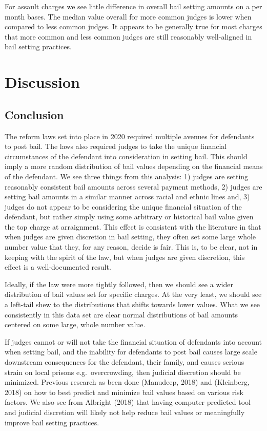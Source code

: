 \documentclass[
  english,
  man]{apa6}
\begin{document}
For assault charges we see little difference in overall bail setting amounts on a per month bases. The median value overall for more common judges is lower when compared to less common judges. It appears to be generally true for most charges that more common and less common judges are still reasonably well-aligned in bail setting practices.

\hypertarget{discussion}{%
\section{Discussion}\label{discussion}}

\hypertarget{conclusion}{%
\subsection{Conclusion}\label{conclusion}}

The reform laws set into place in 2020 required multiple avenues for defendants to post bail. The laws also required judges to take the unique financial circumstances of the defendant into consideration in setting bail. This should imply a more random distribution of bail values depending on the financial means of the defendant. We see three things from this analysis: 1) judges are setting reasonably consistent bail amounts across several payment methods, 2) judges are setting bail amounts in a similar manner across racial and ethnic lines and, 3) judges do not appear to be considering the unique financial situation of the defendant, but rather simply using some arbitrary or historical bail value given the top charge at arraignment. This effect is consistent with the literature in that when judges are given discretion in bail setting, they often set some large whole number value that they, for any reason, decide is fair. This is, to be clear, not in keeping with the spirit of the law, but when judges are given discretion, this effect is a well-documented result.

Ideally, if the law were more tightly followed, then we should see a wider distribution of bail values set for specific charges. At the very least, we should see a left-tail shew to the distributions that shifts towards lower values. What we see consistently in this data set are clear normal distributions of bail amounts centered on some large, whole number value.

If judges cannot or will not take the financial situation of defendants into account when setting bail, and the inability for defendants to post bail causes large scale downstream consequences for the defendant, their family, and causes serious strain on local prisons e.g.~overcrowding, then judicial discretion should be minimized. Previous research as been done (Manudeep, 2018) and (Kleinberg, 2018) on how to best predict and minimize bail values based on various risk factors. We also see from Albright (2018) that having computer predicted tool and judicial discretion will likely not help reduce bail values or meaningfully improve bail setting practices.
\end{document}
